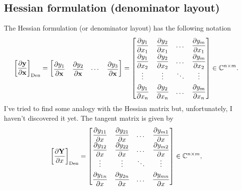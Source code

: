 \documentclass{article}
\begin{document}
\subsection{Hessian formulation (denominator layout)}

The Hessian formulation (or denominator layout) has the following notation
\begin{align}
    \left[ \dfrac{\partial \mathbf{y}}{\partial \mathbf{x}} \right]_{\textnormal{Den}} = \begin{bmatrix}
        \dfrac{\partial y_1}{\partial \mathbf{x}} & \dfrac{\partial y_2}{\partial \mathbf{x}} & \cdots & \dfrac{\partial y_3}{\partial \mathbf{x}}
    \end{bmatrix} = \begin{bmatrix}
        \dfrac{\partial y_1}{\partial x_1} & \dfrac{\partial y_2}{\partial x_1} & \dots & \dfrac{\partial y_m}{\partial x_1} \\
        \dfrac{\partial y_1}{\partial x_2} & \dfrac{\partial y_2}{\partial x_2} & \dots & \dfrac{\partial y_m}{\partial x_2} \\
        \vdots & \vdots & \ddots & \vdots \\
        \dfrac{\partial y_1}{\partial x_n} & \dfrac{\partial y_2}{\partial x_n} & \dots & \dfrac{\partial y_m}{\partial x_n} \\
    \end{bmatrix} \in \mathbb{C}^{n\times m}.
\end{align}
I've tried to find some analogy with the Hessian matrix but, unfortunately, I haven't discovered it yet. The tangent matrix is given by
\begin{align}
    \left[\dfrac{\partial \mathbf{Y}}{\partial x}\right]_{\textnormal{Den}} \renewcommand{\arraystretch}{1.8} = \begin{bmatrix}
        \dfrac{\partial y_{11}}{\partial x} & \dfrac{\partial y_{21}}{\partial x} & \dots & \dfrac{\partial y_{m1}}{\partial x} \\
        \dfrac{\partial y_{12}}{\partial x} & \dfrac{\partial y_{22}}{\partial x} & \dots & \dfrac{\partial y_{m2}}{\partial x} \\
        \vdots & \vdots & \ddots & \vdots \\
        \dfrac{\partial y_{1n}}{\partial x} & \dfrac{\partial y_{2n}}{\partial x} & \dots & \dfrac{\partial y_{mn}}{\partial x} \\
    \end{bmatrix} \in \mathbb{C}^{n \times m},
\end{align}
\end{document}
